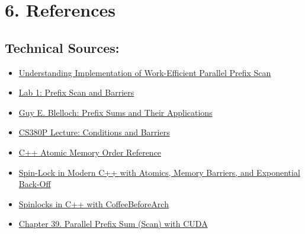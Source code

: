 \documentclass[letterpaper,12pt]{article}
\theoremstyle{remark}
\begin{document}
\section*{6. References}


\subsection*{Technical Sources:}

\begin{itemize}

    \item \href{https://medium.com/nerd-for-tech/understanding-implementation-of-work-efficient-parallel-prefix-scan-cca2d5335c9b}{Understanding Implementation of Work-Efficient Parallel Prefix Scan}
    \item \href{https://www.cs.utexas.edu/~rossbach/cs380p/lab/prefix-sum-pthreads-cs380p.html}{Lab 1: Prefix Scan and Barriers}
    \item \href{https://www.cs.cmu.edu/~guyb/papers/Ble93.pdf}{Guy E. Blelloch: Prefix Sums and Their Applications}
    \item \href{https://www.cs.utexas.edu/~rossbach/cs380p/lectures/06-Conditions+Barriers.pdf}{CS380P Lecture: Conditions and Barriers}
    \item \href{https://en.cppreference.com/w/cpp/atomic/memory_order}{C++ Atomic Memory Order Reference}
    \item \href{https://medium.com/@joao_vaz/spin-lock-in-modern-c-with-atomics-memory-barriers-and-exponential-back-off-522798aca817}{Spin-Lock in Modern C++ with Atomics, Memory Barriers, and Exponential Back-Off}
    \item \href{https://coffeebeforearch.github.io/2020/11/07/spinlocks-6.html}{Spinlocks in C++ with CoffeeBeforeArch}
    \item \href{https://developer.nvidia.com/gpugems/gpugems3/part-vi-gpu-computing/chapter-39-parallel-prefix-sum-scan-cuda}{Chapter 39. Parallel Prefix Sum (Scan) with CUDA}
   \end{itemize}
\end{document}
